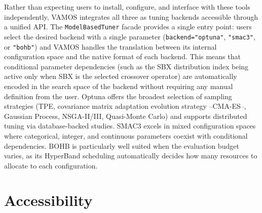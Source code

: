 \documentclass[journal]{IEEEtran}
\newcommand{\VAMOS}{VAMOS}
\begin{document}
Rather than expecting users to install, configure, and interface with these tools independently, \VAMOS{} integrates all three as tuning backends accessible through a unified API. The \texttt{ModelBasedTuner} facade provides a single entry point: users select the desired backend with a single parameter (\texttt{backend="optuna"}, \texttt{"smac3"}, or \texttt{"bohb"}) and \VAMOS{} handles the translation between its internal configuration space and the native format of each backend. This means that conditional parameter dependencies (such as the SBX distribution index being active only when SBX is the selected crossover operator) are automatically encoded in the search space of the backend without requiring any manual definition from the user. Optuna offers the broadest selection of sampling strategies (TPE, covariance matrix adaptation evolution strategy --CMA-ES--, Gaussian Process, NSGA-II/III, Quasi-Monte Carlo) and supports distributed tuning via database-backed studies. SMAC3 excels in mixed configuration spaces where categorical, integer, and continuous parameters coexist with conditional dependencies. BOHB is particularly well suited when the evaluation budget varies, as its HyperBand scheduling automatically decides how many resources to allocate to each configuration.



\section{Accessibility}
\label{sec:accessibility}
\end{document}

